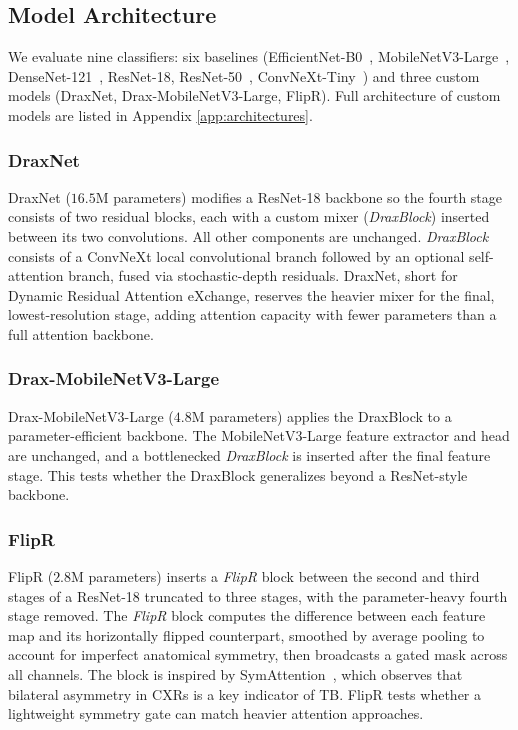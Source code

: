 \documentclass[conference, letterpaper]{IEEEtran}
\begin{document}
\subsection{Model Architecture}

We evaluate nine classifiers: six baselines (EfficientNet-B0~\cite{tan2019efficientnet}, MobileNetV3-Large~\cite{howard2019mobilenetv3}, DenseNet-121~\cite{huang2017densenet}, ResNet-18, ResNet-50~\cite{he2016resnet}, ConvNeXt-Tiny~\cite{liu2022convnext}) and three custom models (DraxNet, Drax-MobileNetV3-Large, FlipR). Full architecture of custom models are listed in Appendix \ref{app:architectures}.

\subsubsection{DraxNet}

DraxNet ($16.5$M parameters) modifies a ResNet-18 backbone so the fourth stage consists of two residual blocks, each with a custom mixer (\emph{DraxBlock}) inserted between its two convolutions. All other components are unchanged. \emph{DraxBlock} consists of a ConvNeXt local convolutional branch followed by an optional self-attention branch, fused via stochastic-depth residuals. DraxNet, short for Dynamic Residual Attention eXchange, reserves the heavier mixer for the final, lowest-resolution stage, adding attention capacity with fewer parameters than a full attention backbone.

\subsubsection{Drax-MobileNetV3-Large}

Drax-MobileNetV3-Large ($4.8$M parameters) applies the DraxBlock to a parameter-efficient backbone. The MobileNetV3-Large feature extractor and head are unchanged, and a bottlenecked \emph{DraxBlock} is inserted after the final feature stage. This tests whether the DraxBlock generalizes beyond a ResNet-style backbone.

\subsubsection{FlipR}

FlipR ($2.8$M parameters) inserts a \emph{FlipR} block between the second and third stages of a ResNet-18 truncated to three stages, with the parameter-heavy fourth stage removed. The \emph{FlipR} block computes the difference between each feature map and its horizontally flipped counterpart, smoothed by average pooling to account for imperfect anatomical symmetry, then broadcasts a gated mask across all channels. The block is inspired by SymAttention~\cite{liu2023tbx11k_pami}, which observes that bilateral asymmetry in CXRs is a key indicator of TB. FlipR tests whether a lightweight symmetry gate can match heavier attention approaches.
\end{document}
